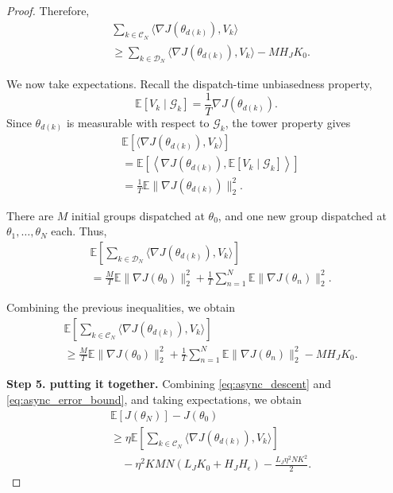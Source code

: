 \begin{proof}
Therefore,
\begin{align*}
&\sum_{k\in\mathcal C_N}
\langle\nabla J(\theta_{d(k)}),V_k\rangle\\
&\ge
\sum_{k\in\mathcal D_N}
\langle\nabla J(\theta_{d(k)}),V_k\rangle
-MH_JK_0.
\end{align*}

We now take expectations. Recall the dispatch-time
unbiasedness property,
\[
\mathbb E[V_k\mid\mathcal G_k]
=\frac1T\nabla J(\theta_{d(k)}).
\]
Since $\theta_{d(k)}$ is measurable with respect
to $\mathcal G_k$, the tower property gives
\begin{align*}
&\mathbb E[
\langle\nabla J(\theta_{d(k)}),V_k\rangle]\\
&=
\mathbb E\left[
\left\langle
\nabla J(\theta_{d(k)}),
\mathbb E[V_k\mid\mathcal G_k]
\right\rangle
\right]\\
&=\frac1T
\mathbb E\|\nabla J(\theta_{d(k)})\|_2^2.
\end{align*}

There are $M$ initial groups dispatched at $\theta_0$,
and one new group dispatched at 
$\theta_1,\ldots,\theta_N$ each. Thus,
\begin{align*}
&\mathbb E\left[
\sum_{k\in\mathcal D_N}
\langle\nabla J(\theta_{d(k)}),V_k\rangle
\right]\\
&=
\frac MT\mathbb E\|\nabla J(\theta_0)\|_2^2
+\frac1T\sum_{n=1}^N
\mathbb E\|\nabla J(\theta_n)\|_2^2.
\end{align*}

Combining the previous inequalities, we obtain
\begin{align}
&\mathbb E\left[
\sum_{k\in\mathcal C_N}
\langle\nabla J(\theta_{d(k)}),V_k\rangle
\right]\nonumber\\
&\ge
\frac MT\mathbb E\|\nabla J(\theta_0)\|_2^2
+\frac1T\sum_{n=1}^N
\mathbb E\|\nabla J(\theta_n)\|_2^2
-MH_JK_0.
\label{eq:dispatch_bound}
\end{align}


\textbf{Step 5. putting it together.}
Combining \eqref{eq:async_descent} and
\eqref{eq:async_error_bound}, and taking expectations,
we obtain
\begin{align*}
&\mathbb E[J(\theta_N)]-J(\theta_0)\\
&\ge
\eta\mathbb E\left[
\sum_{k\in\mathcal C_N}
\langle\nabla J(\theta_{d(k)}),V_k\rangle
\right]\\
&\quad-\eta^2 KMN(L_JK_0+H_JH_\epsilon)
-\frac{L_J\eta^2NK^2}{2}.
\end{align*}


\end{proof}
